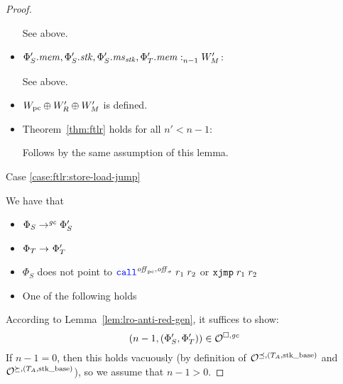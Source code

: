 \begin{proof}
\begin{itemize}
    See above.

  \item $\memSat[n-1]{\Phi_S'.\mem,\Phi_S'.\stk,\Phi_S'.\ms_\stk,\Phi_T'.\mem}{W_M'}$:

    See above.

  \item $W_\pcreg \oplus W_R' \oplus W_M'$ is defined.

  \item Theorem~\ref{thm:ftlr} holds for all $n' < n-1$:

    Follows by the same assumption of this lemma.
  \end{itemize}

  Case \ref{case:ftlr:store-load-jump}

  We have that
  \begin{itemize}
  \item $\Phi_S \step[\gc] \Phi_S'$
  \item $\Phi_T \step \Phi_T'$
  \item $\Phi_S$ does not point to $\scall{\offpc,\offsigma}{r_1}{r_2}$ or $\txjmp{r_1}{r_2}$
  \item One of the following holds
  \end{itemize}

  According to Lemma~\ref{lem:lro-anti-red-gen}, it suffices to show:
  \[
    \npair[n-1]{(\Phi_S',\Phi_T')} \in \lro
  \]
  If $n-1 = 0$, then this holds vacuously (by definition of $\lrol$ and $\lror$), so we assume that $n-1 > 0$.


\end{proof}
